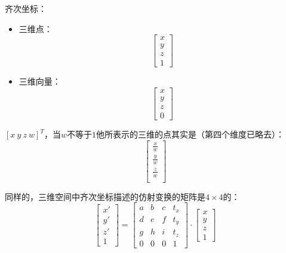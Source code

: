 \documentclass[UTF8]{ctexbook}
\begin{document}
{{{{        齐次坐标：\begin{itemize}
          \item 三维点：$$\left[\begin{array}{c}
                      x \\
                      y \\
                      z \\
                      1
                    \end{array}\right]$$
          \item 三维向量：$$\left[\begin{array}{c}
                      x \\
                      y \\
                      z \\
                      0
                    \end{array}\right]$$
        \end{itemize}

        $\left[x\ y\ z\ w\right]^T$，当$w$不等于$1$他所表示的三维的点其实是（第四个维度已略去）：
        $$\left[\begin{array}{c}
              \frac{x}{w} \\
              \frac{y}{w} \\
              \frac{z}{w} \\
            \end{array}\right]$$

        同样的，三维空间中齐次坐标描述的仿射变换的矩阵是$4 \times 4$的：
        $$\left[\begin{array}{c}
              x\prime \\
              y\prime \\
              z\prime \\
              1
            \end{array}\right]
          =
          \left[\begin{matrix}
              a & b & c & t_x \\
              d & e & f & t_y \\
              g & h & i & t_z \\
              0 & 0 & 0 & 1
            \end{matrix}\right]
          \cdot
          \left[\begin{array}{c}
              x \\
              y \\
              z \\
              1
            \end{array}\right]$$
      }

}}}
\end{document}
